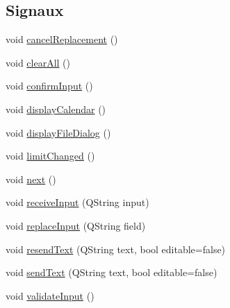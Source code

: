 \subsection*{Signaux}
\begin{DoxyCompactItemize}
\item 
void \hyperlink{classSH__InOutStateMachine_a035d37535533d4805fe2606f38c19380}{cancel\-Replacement} ()
\item 
void \hyperlink{classSH__InOutStateMachine_aa1d5860888c96ff94c55dc77e0fdfdcf}{clear\-All} ()
\item 
void \hyperlink{classSH__InOutStateMachine_a7f7d9c9300c1d05bce2c26029f28cc31}{confirm\-Input} ()
\item 
void \hyperlink{classSH__InOutStateMachine_ab3a12d1f9b658d8ffdc17669a6c065f2}{display\-Calendar} ()
\item 
void \hyperlink{classSH__InOutStateMachine_abd206c3bc32bb7690df9c3e1cd546ebc}{display\-File\-Dialog} ()
\item 
void \hyperlink{classSh__LoopingInOutStateMachine_a6d20b3e0b70c0f078b6786048960db51}{limit\-Changed} ()
\item 
void \hyperlink{classSH__InOutStateMachine_a9cd7dbaf4da10a65d788a5d85397bebe}{next} ()
\item 
void \hyperlink{classSH__InOutStateMachine_a037ed5e13ecfae2123a8d4940292e410}{receive\-Input} (Q\-String input)
\item 
void \hyperlink{classSH__InOutStateMachine_a9fa5db44086de2576c812f631aa4f60a}{replace\-Input} (Q\-String field)
\item 
void \hyperlink{classSH__InOutStateMachine_a526822c66b46aa0cd81ba4473fa5573f}{resend\-Text} (Q\-String text, bool editable=false)
\item 
void \hyperlink{classSH__InOutStateMachine_a5e7f5958bae31696b6a8deab94ad2b4f}{send\-Text} (Q\-String text, bool editable=false)
\item 
void \hyperlink{classSH__InOutStateMachine_aec1b3fef3c1f82499aa1f73beaecd08a}{validate\-Input} ()
\end{DoxyCompactItemize}
